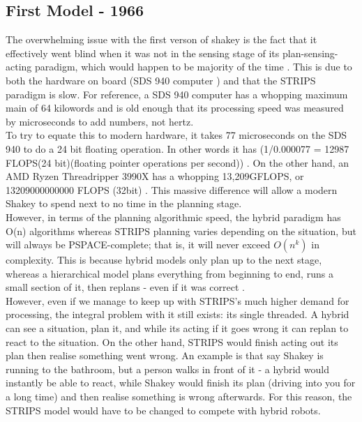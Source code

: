 \documentclass{article}
\newcommand\tab[1][1cm]{\hspace*{#1}}
\begin{document}
\subsection*{First Model - 1966}
The overwhelming issue with the first verson of shakey is the fact that
it effectively went blind when it was not in the sensing stage of its
plan-sensing-acting paradigm, which would happen to be majority of the time
\cite{IntroToAI}. This is due to both the hardware on board (SDS 940 computer
\cite{shakeyHistory}) and that the STRIPS paradigm is slow. For reference, a SDS
940 computer has a whopping maximum main of 64 kilowords and is old enough that
its processing speed was measured by microseconds to add numbers, not hertz.  \\

\tab To try to equate this to modern hardware, it takes 77 microseconds on the
SDS 940 to do a 24 bit floating operation. In other words it has (1/0.000077 =
12987 FLOPS(24 bit)(floating pointer operations per second)) \cite{SDS940}. 
On the other hand, an AMD Ryzen Threadripper 3990X has a whopping 13,209GFLOPS,
or 13209000000000 FLOPS (32bit) \cite{threadripper}. This massive difference
will allow a modern Shakey to spend next to no time in the planning stage.
\\
\tab However, in terms of the planning algorithmic speed, the hybrid
paradigm has O(n) algorithms \cite{IntroToAI}  
whereas STRIPS planning varies depending on the situation, but will always be 
PSPACE-complete; that is, it will never exceed $O(n^k)$ in complexity. This is
because hybrid models only plan up to the next stage, whereas a hierarchical
model plans everything from beginning to end, runs a small section of it, then
replans - even if it was correct \cite{shakey}.
\\
\tab However, even if we manage to keep up with STRIPS's much higher demand for
processing, the integral problem with it still exists: its single threaded. A
hybrid can see a situation, plan it, and while its acting if it goes wrong 
it can replan to react to the situation. On the other hand, STRIPS would finish
acting out its plan then realise something went wrong. An example is that say
Shakey is running to the bathroom, but a person walks in front of it - a hybrid
would instantly be able to react, while Shakey would finish its plan (driving
into you for a long time) and then realise something is wrong afterwards. For
this reason, the STRIPS model would have to be changed to compete with hybrid
robots. 
\end{document}
